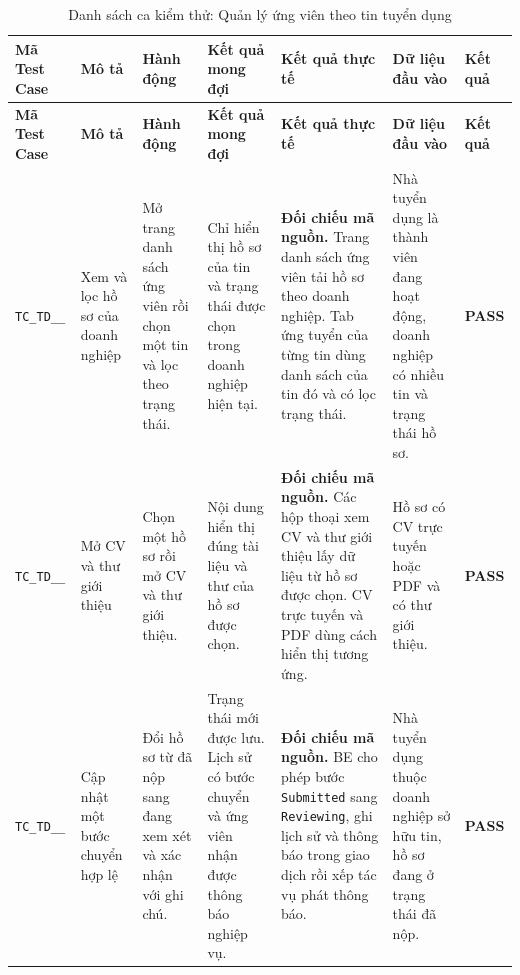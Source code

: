 \begin{landscape}
{
\fontsize{9.5}{11.5}\selectfont
\setlength{\tabcolsep}{3pt}
\renewcommand{\arraystretch}{1.2}
\begin{longtable}{|>{\raggedright\arraybackslash}p{2.1cm}|>{\raggedright\arraybackslash}p{2.8cm}|>{\raggedright\arraybackslash}p{3.8cm}|>{\raggedright\arraybackslash}p{4.0cm}|>{\raggedright\arraybackslash}p{5.0cm}|>{\raggedright\arraybackslash}p{3.2cm}|>{\centering\arraybackslash}p{1.3cm}|}
    \caption{Danh sách ca kiểm thử: Quản lý ứng viên theo tin tuyển dụng} \label{tab:ts-td-05} \\
    \hline
    \textbf{Mã Test Case} & \textbf{Mô tả} & \textbf{Hành động} & \textbf{Kết quả mong đợi} & \textbf{Kết quả thực tế} & \textbf{Dữ liệu đầu vào} & \textbf{Kết quả} \\
    \hline
    \endfirsthead
    \hline
    \textbf{Mã Test Case} & \textbf{Mô tả} & \textbf{Hành động} & \textbf{Kết quả mong đợi} & \textbf{Kết quả thực tế} & \textbf{Dữ liệu đầu vào} & \textbf{Kết quả} \\
    \hline
    \endhead
    \hline
    \endfoot
    \hline
    \endlastfoot
    \texttt{TC\_\allowbreak TD\_\allowbreak 05\_\allowbreak 01} & Xem và lọc hồ sơ của doanh nghiệp & Mở trang danh sách ứng viên rồi chọn một tin và lọc theo trạng thái. & Chỉ hiển thị hồ sơ của tin và trạng thái được chọn trong doanh nghiệp hiện tại. & \textbf{Đối chiếu mã nguồn.} Trang danh sách ứng viên tải hồ sơ theo doanh nghiệp. Tab ứng tuyển của từng tin dùng danh sách của tin đó và có lọc trạng thái. & Nhà tuyển dụng là thành viên đang hoạt động, doanh nghiệp có nhiều tin và trạng thái hồ sơ. & \textbf{PASS} \\
    \hline
    \texttt{TC\_\allowbreak TD\_\allowbreak 05\_\allowbreak 02} & Mở CV và thư giới thiệu & Chọn một hồ sơ rồi mở CV và thư giới thiệu. & Nội dung hiển thị đúng tài liệu và thư của hồ sơ được chọn. & \textbf{Đối chiếu mã nguồn.} Các hộp thoại xem CV và thư giới thiệu lấy dữ liệu từ hồ sơ được chọn. CV trực tuyến và PDF dùng cách hiển thị tương ứng. & Hồ sơ có CV trực tuyến hoặc PDF và có thư giới thiệu. & \textbf{PASS} \\
    \hline
    \texttt{TC\_\allowbreak TD\_\allowbreak 05\_\allowbreak 03} & Cập nhật một bước chuyển hợp lệ & Đổi hồ sơ từ đã nộp sang đang xem xét và xác nhận với ghi chú. & Trạng thái mới được lưu. Lịch sử có bước chuyển và ứng viên nhận được thông báo nghiệp vụ. & \textbf{Đối chiếu mã nguồn.} BE cho phép bước \texttt{Submitted} sang \texttt{Reviewing}, ghi lịch sử và thông báo trong giao dịch rồi xếp tác vụ phát thông báo. & Nhà tuyển dụng thuộc doanh nghiệp sở hữu tin, hồ sơ đang ở trạng thái đã nộp. & \textbf{PASS} \\

\end{longtable}}
\end{landscape}
